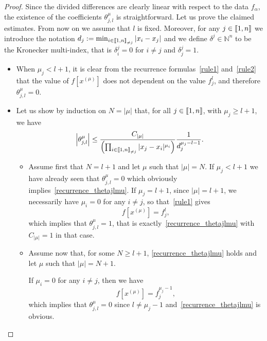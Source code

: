 \documentclass[AHL,Unicode,longabstracts]{cedram}
\newcommand{\llbracket}{\mathopen{[\mkern -2.7mu[}}
\newcommand{\rrbracket}{\mathclose{]\mkern -2.7mu]}}
\newcommand{\inter}[2]{\llbracket #1,#2 \rrbracket}
\newcommand{\interexclu}[3]{\llbracket #1,#2\rrbracket_{\neq #3}}
\newcommand{\N}{\mathbb{N}}
\begin{document}
\begin{proof}
Since the divided differences are clearly linear with respect to the data $f_\alpha$, the existence of the coefficients $\theta_{j,l}^\mu$ is straightforward. Let us prove the claimed estimates. From now on we assume that $l$ is fixed. Moreover, for any $j\in \inter{1}{n}$ we introduce the notation $d_j:= \min_{i\in\interexclu{1}{n}{j}} |x_i-x_j|$ and we define $\delta^j\in \N^n$ to be the Kronecker multi-index, that is $\delta_i^j=0$ for $i\neq j$ and $\delta_j^j=1$.
\begin{itemize}
\item When $\mu_j<l+1$, it is clear from the recurrence formulas~\eqref{rule1} and~\eqref{rule2} that the value of $f[x^{(\mu)}]$ does not dependent on the value $f_j^l$, and therefore $\theta_{j,l}^\mu=0$.
\item Let us show by induction on $N=|\mu|$ that, for all $j\in \inter{1}{n}$, with $\mu_j\geq l+1$, we have
\begin{equation}\label{recurrence_thetajlmu}
\left|\theta_{j,l}^\mu\right| \leq \frac{C_{|\mu|}}{\left(\prod_{i\in\interexclu{1}{n}{j}} |x_j-x_i|^{\mu_i}\right)} \frac{1}{d_j^{\mu_j-l-1}}.
\end{equation}
\begin{itemize}
\item Assume first that $N=l+1$ and let $\mu$ such that $|\mu|=N$. If $\mu_j<l+1$ we have already seen that $\theta_{j,l}^\mu=0$ which obviously implies~\eqref{recurrence_thetajlmu}. If $\mu_j=l+1$, since $|\mu|=l+1$, we necessarily have $\mu_i=0$ for any $i\neq j$, so that~\eqref{rule1} gives
\[
f\left[x^{(\mu)}\right] = f_j^l,
\]
which implies that $\theta_{j,l}^\mu=1$, that is exactly~\eqref{recurrence_thetajlmu} with $C_{|\mu|}=1$ in that case.
\item Assume now that, for some $N\geq l+1$, \eqref{recurrence_thetajlmu} holds and let $\mu$ such that $|\mu|=N+1$.

If $\mu_i=0$ for any $i\neq j$, then we have
\[
f\left[x^{(\mu)}\right] = f_j^{\mu_j-1},
\]
which implies that $\theta_{j,l}^\mu=0$ since $l\neq \mu_j-1$ and~\eqref{recurrence_thetajlmu} is obvious.


\end{itemize}
\end{itemize}
\end{proof}
\end{document}
